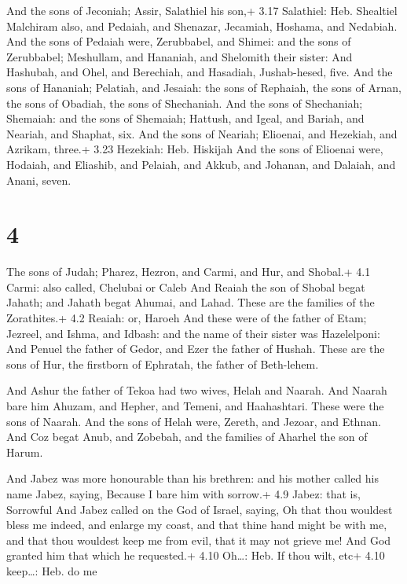  And the sons of Jeconiah; Assir, Salathiel his son,+
3.17 Salathiel: Heb. Shealtiel  Malchiram also, and
Pedaiah, and Shenazar, Jecamiah, Hoshama, and Nedabiah. 
And the sons of Pedaiah were, Zerubbabel, and Shimei: and the sons of
Zerubbabel; Meshullam, and Hananiah, and Shelomith their sister:
 And Hashubah, and Ohel, and Berechiah, and Hasadiah,
Jushab-hesed, five.  And the sons of Hananiah; Pelatiah,
and Jesaiah: the sons of Rephaiah, the sons of Arnan, the sons of
Obadiah, the sons of Shechaniah.  And the sons of
Shechaniah; Shemaiah: and the sons of Shemaiah; Hattush, and Igeal, and
Bariah, and Neariah, and Shaphat, six.  And the sons of
Neariah; Elioenai, and Hezekiah, and Azrikam, three.+ 3.23 Hezekiah:
Heb. Hiskijah  And the sons of Elioenai were, Hodaiah, and
Eliashib, and Pelaiah, and Akkub, and Johanan, and Dalaiah, and Anani,
seven.

\hypertarget{section-3}{%
\section{4}\label{section-3}}

 The sons of Judah; Pharez, Hezron, and Carmi, and Hur, and
Shobal.+ 4.1 Carmi: also called, Chelubai or Caleb  And
Reaiah the son of Shobal begat Jahath; and Jahath begat Ahumai, and
Lahad. These are the families of the Zorathites.+ 4.2 Reaiah: or, Haroeh
 And these were of the father of Etam; Jezreel, and Ishma,
and Idbash: and the name of their sister was Hazelelponi: 
And Penuel the father of Gedor, and Ezer the father of Hushah. These are
the sons of Hur, the firstborn of Ephratah, the father of Beth-lehem.

 And Ashur the father of Tekoa had two wives, Helah and
Naarah.  And Naarah bare him Ahuzam, and Hepher, and Temeni,
and Haahashtari. These were the sons of Naarah.  And the
sons of Helah were, Zereth, and Jezoar, and Ethnan.  And Coz
begat Anub, and Zobebah, and the families of Aharhel the son of Harum.

 And Jabez was more honourable than his brethren: and his
mother called his name Jabez, saying, Because I bare him with sorrow.+
4.9 Jabez: that is, Sorrowful  And Jabez called on the God
of Israel, saying, Oh that thou wouldest bless me indeed, and enlarge my
coast, and that thine hand might be with me, and that thou wouldest keep
me from evil, that it may not grieve me! And God granted him that which
he requested.+ 4.10 Oh\ldots: Heb. If thou wilt, etc+ 4.10 keep\ldots:
Heb. do me

